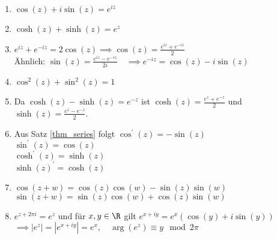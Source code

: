 		\begin{enumerate}[label={\alph*})]
			\item $ \cos(z) + i\sin(z) = e^{iz} $
			\item $ \cosh(z) + \sinh(z) = e^z $
			\item $ e^{iz} + e^{-iz} = 2 \cos(z) \implies \cos(z) = \frac{e^{iz} + e^{-iz}}{2} $\\
			Ähnlich: $ \sin(z) = \frac{e^{iz} - e^{-iz}}{2i} \quad \implies e^{-iz} = \cos(z) -i\sin(z) $
			\item $ \cos^2(z) + \sin^2(z) = 1 $
			\item Da $ \cosh(z) - \sinh(z) = e^{-z} $ ist $ \cosh(z) = \frac{e^{z} + e^{-z}}{2} $ und $ \sinh(z) = \frac{e^{z} - e^{-z}}{2} $.
			\item Aus Satz \ref{thm_series} folgt $ \cos^\prime(z) = -\sin(z) $\\
			$ \sin^\prime(z) = \cos(z) $\\
			$ \cosh^\prime(z) = \sinh(z) $\\
			$ \sinh(z)^\prime = \cosh(z) $
			\item $ \cos(z+w) = \cos(z)\cos(w) - \sin(z)\sin(w) $\\
			$ \sin(z+w) = \sin(z)\cos(w) + \cos(z)\sin(w) $
			\item $ e^{z+2\pi i} = e^z $ und für $ x,y \in \R $ gilt $ e^{x+iy} = e^x(\cos(y)+i\sin(y)) $\\
			$ \implies |e^z| = |e^{x+iy}| = e^x, \quad \arg(e^z) \equiv y \mod 2\pi $
		\end{enumerate}